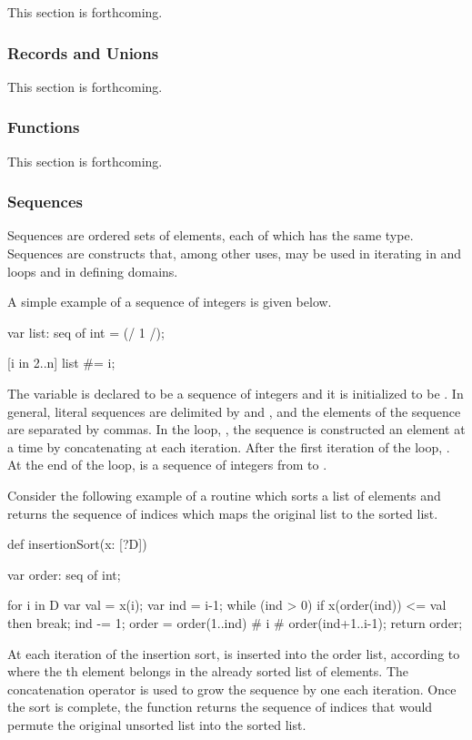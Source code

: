 This section is forthcoming.

\subsubsection{Records and Unions}
\label{Intro_Records_and_Unions}

This section is forthcoming.

\subsubsection{Functions}
\label{Intro_Functions}

This section is forthcoming.

\subsubsection{Sequences}
\label{Intro_Sequences}

Sequences are ordered sets of elements, each of which has the same type.
Sequences are constructs that, among other uses, may be used in iterating in 
and  loops and in defining domains.  

A simple example of a sequence of integers is given below.
\begin{chapel}
var list: seq of int = (/ 1 /);

[i in 2..n] list #= i;
\end{chapel}
The variable  is declared to be a sequence of integers and it is 
initialized to be . In general, literal sequences are delimited by 
\chpl{(/} and \chpl{/)}, and the elements of the sequence are separated by commas.
In the loop, \chpl{[i in 2..n]}, the sequence  is constructed an element 
at a time by concatenating  at each iteration. After the first iteration 
of the loop, . At the end of the loop,
 is a sequence of integers from  to .

Consider the following example of a routine which sorts a list 
of elements and returns the sequence of indices which maps the original
list to the sorted list.
\begin{example}
\begin{chapel}
def insertionSort(x: [?D]) {
  var order: seq of int;

  for i in D {
    var val = x(i);
    var ind = i-1;
    while (ind > 0) {
      if x(order(ind)) <= val then break;
      ind -= 1;
    }
    order = order(1..ind) # i # order(ind+1..i-1);
  }
  return order;
}
\end{chapel}
\end{example}
At each iteration of the insertion sort,  is inserted into the
order list, according to where the th element belongs in
the already sorted list of  elements.  The concatenation operator 
\chpl{#} is used to grow the sequence by one each iteration.  Once the sort is
complete, the function returns the sequence of indices that would permute
the original unsorted list into the sorted list.

